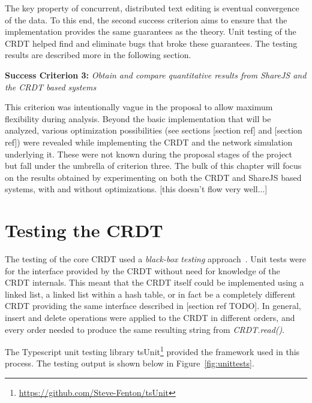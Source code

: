 \documentclass[12pt,a4paper,twoside,openright]{report}
\begin{document}
	The key property of concurrent, distributed text editing is eventual convergence of the data. To this end, the second success criterion aims to ensure that the implementation provides the same guarantees as the theory. Unit testing of the CRDT helped find and eliminate bugs that broke these guarantees. The testing results are described more in the following section.
	

	\textbf{Success Criterion 3:} \textit{Obtain and compare quantitative results from ShareJS and the CRDT based systems}
	
	This criterion was intentionally vague in the proposal to allow maximum flexibility during analysis. Beyond the basic implementation that will be analyzed, various optimization possibilities (see sections [section ref] and [section ref]) were revealed while implementing the CRDT and the network simulation underlying it. These were not known during the proposal stages of the project but fall under the umbrella of criterion three. The bulk of this chapter will focus on the results obtained by experimenting on both the CRDT and ShareJS based systems, with and without optimizations.
	[this doesn't flow very well...]
	
	
	
	\section{Testing the CRDT}
	
	The testing of the core CRDT used a \textit{black-box testing} approach~\cite{Patton}. Unit tests were for the interface provided by the CRDT without need for knowledge of the CRDT internals. This meant that the CRDT itself could be implemented using a linked list, a linked list within a hash table, or in fact be a completely different CRDT providing the same interface described in [section ref TODO]. In general, insert and delete operations were applied to the CRDT in different orders, and every order needed to produce the same resulting string from \textit{CRDT.read()}.
	
	The Typescript unit testing library tsUnit\footnote{\url{https://github.com/Steve-Fenton/tsUnit}} provided the framework used in this process. The testing output is shown below in Figure~\ref{fig:unittests}.
\end{document}
